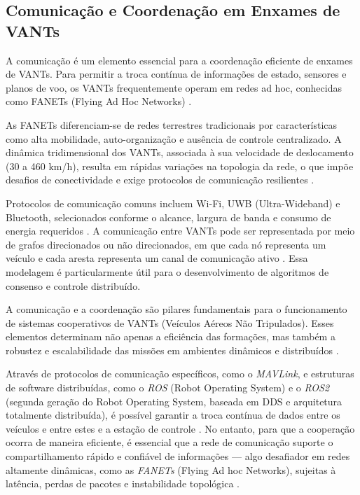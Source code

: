 \subsection{Comunicação e Coordenação em Enxames de VANTs}

A comunicação é um elemento essencial para a coordenação eficiente de enxames de VANTs. Para permitir a troca contínua de informações de estado, sensores e planos de voo, os VANTs frequentemente operam em redes ad hoc, conhecidas como FANETs (Flying Ad Hoc Networks) \citep{khan2017fanet, hong2020swarm}.

As FANETs diferenciam-se de redes terrestres tradicionais por características como alta mobilidade, auto-organização e ausência de controle centralizado. A dinâmica tridimensional dos VANTs, associada à sua velocidade de deslocamento (30 a 460 km/h), resulta em rápidas variações na topologia da rede, o que impõe desafios de conectividade e exige protocolos de comunicação resilientes \citep{khan2017fanet}.

Protocolos de comunicação comuns incluem Wi-Fi, UWB (Ultra-Wideband) e Bluetooth, selecionados conforme o alcance, largura de banda e consumo de energia requeridos \citep{chung2018survey}. A comunicação entre VANTs pode ser representada por meio de grafos direcionados ou não direcionados, em que cada nó representa um veículo e cada aresta representa um canal de comunicação ativo \citep{ren2007consensus}. Essa modelagem é particularmente útil para o desenvolvimento de algoritmos de consenso e controle distribuído.

A comunicação e a coordenação são pilares fundamentais para o funcionamento de sistemas cooperativos de VANTs (Veículos Aéreos Não Tripulados). Esses elementos determinam não apenas a eficiência das formações, mas também a robustez e escalabilidade das missões em ambientes dinâmicos e distribuídos \citep{ren2007consensus, Young-Min2018, khaliq2021}.

Através de protocolos de comunicação específicos, como o \textit{MAVLink}, e estruturas de software distribuídas, como o \textit{ROS} (Robot Operating System) e o \textit{ROS2} (segunda geração do Robot Operating System, baseada em DDS e arquitetura totalmente distribuída), é possível garantir a troca contínua de dados entre os veículos e entre estes e a estação de controle \citep{ziming2023}. No entanto, para que a cooperação ocorra de maneira eficiente, é essencial que a rede de comunicação suporte o compartilhamento rápido e confiável de informações — algo desafiador em redes altamente dinâmicas, como as \textit{FANETs} (Flying Ad hoc Networks), sujeitas à latência, perdas de pacotes e instabilidade topológica \citep{inam2017, hong2020swarm, ouyang2023formation}.

